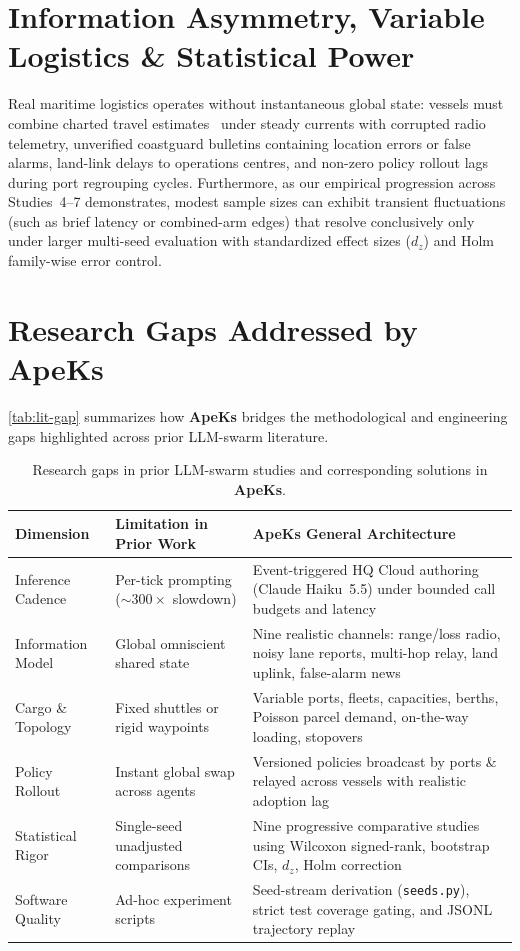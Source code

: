 \documentclass[11pt,a4paper,oneside]{report}
\begin{document}
\section{Information Asymmetry, Variable Logistics \& Statistical Power}
Real maritime logistics operates without instantaneous global state: vessels must combine charted travel estimates~\citep{Hart1968} under steady currents with corrupted radio telemetry, unverified coastguard bulletins containing location errors or false alarms, land-link delays to operations centres, and non-zero policy rollout lags during port regrouping cycles. Furthermore, as our empirical progression across Studies~4--7 demonstrates, modest sample sizes can exhibit transient fluctuations (such as brief latency or combined-arm edges) that resolve conclusively only under larger multi-seed evaluation with standardized effect sizes ($d_z$) and Holm family-wise error control.

\section{Research Gaps Addressed by ApeKs}
\autoref{tab:lit-gap} summarizes how \textbf{ApeKs} bridges the methodological and engineering gaps highlighted across prior LLM-swarm literature.

\begin{table}[H]
\centering
\caption[Prior LLM-swarm research gaps vs.\ ApeKs]{Research gaps in prior LLM-swarm studies and corresponding solutions in \textbf{ApeKs}.}
\label{tab:lit-gap}
\begin{tabularx}{\textwidth}{@{}l>{\raggedright\arraybackslash}X>{\raggedright\arraybackslash}X@{}}
\toprule
\textbf{Dimension} & \textbf{Limitation in Prior Work~\citep{Rahman2026}} & \textbf{ApeKs General Architecture} \\
\midrule
Inference Cadence & Per-tick prompting ($\sim 300\times$ slowdown) & Event-triggered HQ Cloud authoring (Claude Haiku~5.5) under bounded call budgets and latency \\
Information Model & Global omniscient shared state & Nine realistic channels: range/loss radio, noisy lane reports, multi-hop relay, land uplink, false-alarm news \\
Cargo \& Topology & Fixed shuttles or rigid waypoints & Variable ports, fleets, capacities, berths, Poisson parcel demand, on-the-way loading, stopovers \\
Policy Rollout & Instant global swap across agents & Versioned policies broadcast by ports \& relayed across vessels with realistic adoption lag \\
Statistical Rigor & Single-seed unadjusted comparisons & Nine progressive comparative studies using Wilcoxon signed-rank, bootstrap CIs, $d_z$, Holm correction \\
Software Quality & Ad-hoc experiment scripts & Seed-stream derivation (\texttt{seeds.py}), strict test coverage gating, and JSONL trajectory replay \\
\bottomrule
\end{tabularx}
\end{table}
\end{document}
